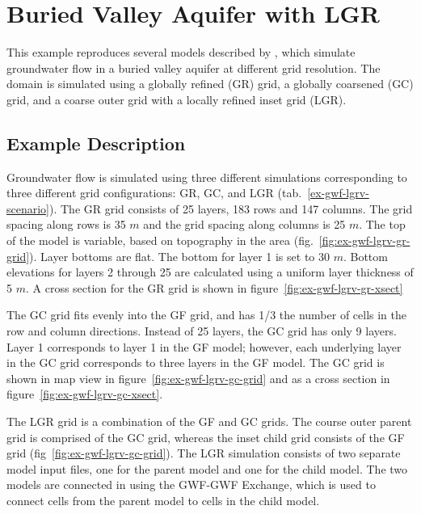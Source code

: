 \section{Buried Valley Aquifer with LGR}

This example reproduces several models described by \cite{vilhelmsen2012}, which simulate groundwater flow in a buried valley aquifer at different grid resolution.  The domain is simulated using a globally refined (GR) grid, a globally coarsened (GC) grid, and a coarse outer grid with a locally refined inset grid (LGR).  

\subsection{Example Description}

Groundwater flow is simulated using three different simulations corresponding to three different grid configurations: GR, GC, and LGR (tab.~\ref{ex-gwf-lgrv-scenario}).  The GR grid consists of 25 layers, 183 rows and 147 columns.  The grid spacing along rows is 35 $m$ and the grid spacing along columns is 25 $m$.  The top of the model is variable, based on topography in the area (fig.~\ref{fig:ex-gwf-lgrv-gr-grid}).  Layer bottoms are flat.  The bottom for layer 1 is set to 30 $m$.  Bottom elevations for layers 2 through 25 are calculated using a uniform layer thickness of 5 $m$.  A cross section for the GR grid is shown in figure~\ref{fig:ex-gwf-lgrv-gr-xsect}

The GC grid fits evenly into the GF grid, and has 1/3 the number of cells in the row and column directions.  Instead of 25 layers, the GC grid has only 9 layers.  Layer 1 corresponds to layer 1 in the GF model; however, each underlying layer in the GC grid corresponds to three layers in the GF model.  The GC grid is shown in map view in figure~\ref{fig:ex-gwf-lgrv-gc-grid} and as a cross section in figure~\ref{fig:ex-gwf-lgrv-gc-xsect}.

The LGR grid is a combination of the GF and GC grids.  The course outer parent grid is comprised of the GC grid, whereas the inset child grid consists of the GF grid (fig~\ref{fig:ex-gwf-lgrv-gc-grid}).  The LGR simulation consists of two separate model input files, one for the parent model and one for the child model.  The two models are connected in \mf using the GWF-GWF Exchange, which is used to connect cells from the parent model to cells in the child model.


